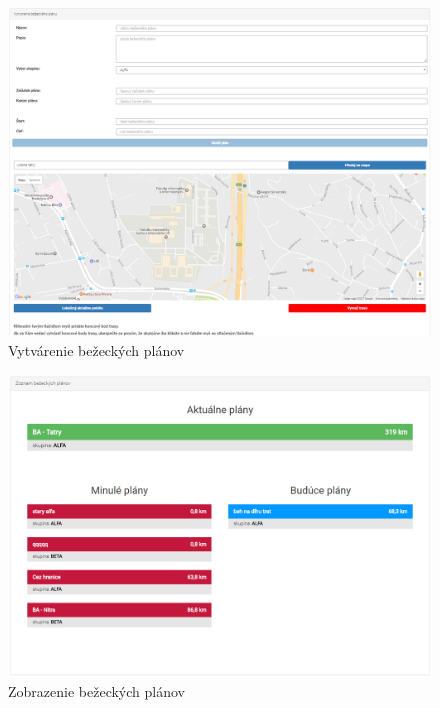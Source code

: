 \documentclass[12pt,a4paper]{report}
\theoremstyle{definition}
\theoremstyle{remark}
\begin{document}
\begin{figure}[H]
\centering
\includegraphics[width=\textwidth]{createRPlan.png}
\caption{Vytvárenie bežeckých plánov \label{createRPlan}}

\end{figure}

\begin{figure}[H]
\centering
\includegraphics[width=\textwidth]{RPlanList.png}
\caption{Zobrazenie bežeckých plánov \label{RPlanList}}
\end{figure}
\end{document}
